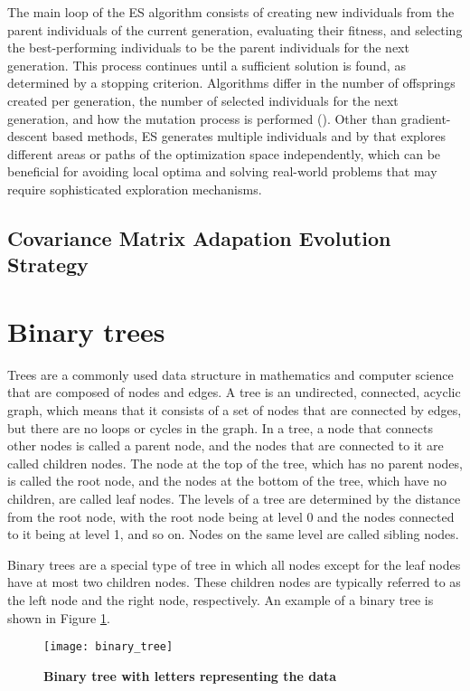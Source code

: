The main loop of the ES algorithm consists of creating new individuals from the parent individuals of the current generation, evaluating their fitness, and selecting the best-performing individuals to be the parent individuals for the next generation. This process continues until a sufficient solution is found, as determined by a stopping criterion. Algorithms differ in the number of offsprings created per generation, the number of selected individuals for the next generation, and how the mutation process is performed (\cite{salimans_evolution_2017}). Other than gradient-descent based methods, ES generates multiple individuals and by that explores different areas or paths of the optimization space independently, which can be beneficial for avoiding local optima and solving real-world problems that may require sophisticated exploration mechanisms.


\subsection{Covariance Matrix Adapation Evolution Strategy}

\section{Binary trees}

Trees are a commonly used data structure in mathematics and computer science that are composed of nodes and edges. A tree is an undirected, connected, acyclic graph, which means that it consists of a set of nodes that are connected by edges, but there are no loops or cycles in the graph. In a tree, a node that connects other nodes is called a parent node, and the nodes that are connected to it are called children nodes. The node at the top of the tree, which has no parent nodes, is called the root node, and the nodes at the bottom of the tree, which have no children, are called leaf nodes. The levels of a tree are determined by the distance from the root node, with the root node being at level 0 and the nodes connected to it being at level 1, and so on. Nodes on the same level are called sibling nodes.

Binary trees are a special type of tree in which all nodes except for the leaf nodes have at most two children nodes. These children nodes are typically referred to as the left node and the right node, respectively. An example of a binary tree is shown in Figure \ref{fig:binary_tree}.

\begin{figure}[!ht]
\centering
\texttt{[image: binary\_tree]}
\caption[Binary tree with letters representing the data]{
  \textbf{Binary tree with letters representing the data}
  }
\label{fig:binary_tree}
\end{figure}

